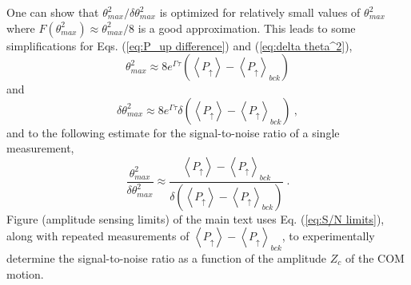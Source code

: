 \documentclass[aps,prl,superscriptaddress,floatfix]{revtex4-1}
\begin{document}
One can show that $\theta_{max}^{2}/\delta\theta_{max}^{2}$ is optimized
for relatively small values of $\theta_{max}^{2}$ where $F\left(\theta_{max}^{2}\right)\approx\theta_{max}^{2}/8$
is a good approximation. This leads to some simplifications for Eqs.
(\ref{eq:P_up difference}) and (\ref{eq:delta theta^2}),
\begin{equation}
\theta_{max}^{2}\approx8e^{\Gamma\tau}\left(\left\langle P_{\uparrow}\right\rangle -\left\langle P_{\uparrow}\right\rangle _{bck}\right)\label{eq:theta_max^sq}
\end{equation}
and
\begin{equation}
\delta\theta_{max}^{2}\approx8e^{\Gamma\tau}\delta\left(\left\langle P_{\uparrow}\right\rangle -\left\langle P_{\uparrow}\right\rangle _{bck}\right)\:,\label{eq:delta theta_max^2}
\end{equation}
and to the following estimate for the signal-to-noise ratio of a single
measurement,
\begin{equation}
\frac{\theta_{max}^{2}}{\delta\theta_{max}^{2}}\approx\frac{\left\langle P_{\uparrow}\right\rangle -\left\langle P_{\uparrow}\right\rangle _{bck}}{\delta\left(\left\langle P_{\uparrow}\right\rangle -\left\langle P_{\uparrow}\right\rangle _{bck}\right)}\:.\label{eq:S/N limits}
\end{equation}
Figure (amplitude sensing limits) of the main text uses Eq. (\ref{eq:S/N limits}),
along with repeated measurements of $\left\langle P_{\uparrow}\right\rangle -\left\langle P_{\uparrow}\right\rangle _{bck}$,
to experimentally determine the signal-to-noise ratio as a function
of the amplitude $Z_{c}$ of the COM motion.
\end{document}
